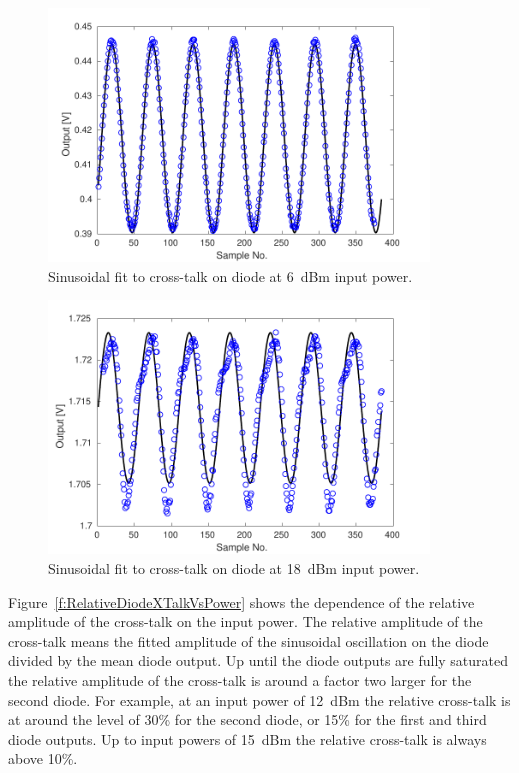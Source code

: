 \begin{figure}
  \centering
  \includegraphics[width=0.9\textwidth]{Figures/phaseMons/Diode1_Power6}
  \caption{Sinusoidal fit to cross-talk on diode at 6~dBm input power.}
  \label{f:Diode1_Power6}
\end{figure}

\begin{figure}
  \centering
  \includegraphics[width=0.9\textwidth]{Figures/phaseMons/Diode1_Power18}
  \caption{Sinusoidal fit to cross-talk on diode at 18~dBm input power.}
  \label{f:Diode1_Power18}
\end{figure}

Figure~\ref{f:RelativeDiodeXTalkVsPower} shows the dependence of the relative amplitude of the cross-talk on the input power. The relative amplitude of the cross-talk means the fitted amplitude of the sinusoidal oscillation on the diode divided by the mean diode output. Up until the diode outputs are fully saturated the relative amplitude of the cross-talk is around a factor two larger for the second diode. For example, at an input power of 12~dBm the relative cross-talk is at around the level of 30\% for the second diode, or 15\% for the first and third diode outputs. Up to input powers of 15~dBm the relative cross-talk is always above 10\%.

